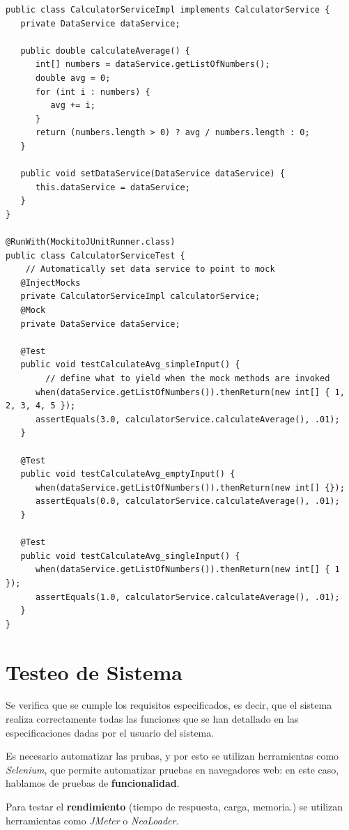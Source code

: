 \begin{lstlisting}
public class CalculatorServiceImpl implements CalculatorService {
   private DataService dataService;

   public double calculateAverage() {
      int[] numbers = dataService.getListOfNumbers();
      double avg = 0;
      for (int i : numbers) {
         avg += i;
      }
      return (numbers.length > 0) ? avg / numbers.length : 0;
   }

   public void setDataService(DataService dataService) {
      this.dataService = dataService;
   }
}

@RunWith(MockitoJUnitRunner.class)
public class CalculatorServiceTest {
	// Automatically set data service to point to mock
   @InjectMocks
   private CalculatorServiceImpl calculatorService;
   @Mock
   private DataService dataService;

   @Test
   public void testCalculateAvg_simpleInput() {
		// define what to yield when the mock methods are invoked
      when(dataService.getListOfNumbers()).thenReturn(new int[] { 1, 2, 3, 4, 5 });
      assertEquals(3.0, calculatorService.calculateAverage(), .01);
   }

   @Test
   public void testCalculateAvg_emptyInput() {
      when(dataService.getListOfNumbers()).thenReturn(new int[] {});
      assertEquals(0.0, calculatorService.calculateAverage(), .01);
   }

   @Test
   public void testCalculateAvg_singleInput() {
      when(dataService.getListOfNumbers()).thenReturn(new int[] { 1 });
      assertEquals(1.0, calculatorService.calculateAverage(), .01);
   }
}
\end{lstlisting}

\section{Testeo de Sistema}
Se verifica que se cumple los requisitos especificados, es decir, que el sistema realiza correctamente todas las funciones que se han detallado en las especificaciones dadas por el usuario del sistema.

Es necesario automatizar las prubas, y por esto se utilizan herramientas como \textit{Selenium}, que permite automatizar pruebas en navegadores web: en este caso, hablamos de pruebas de \textbf{funcionalidad}.

Para testar el \textbf{rendimiento} (tiempo de respuesta, carga, memoria.) se utilizan herramientas como \textit{JMeter} o \textit{NeoLoader}.

